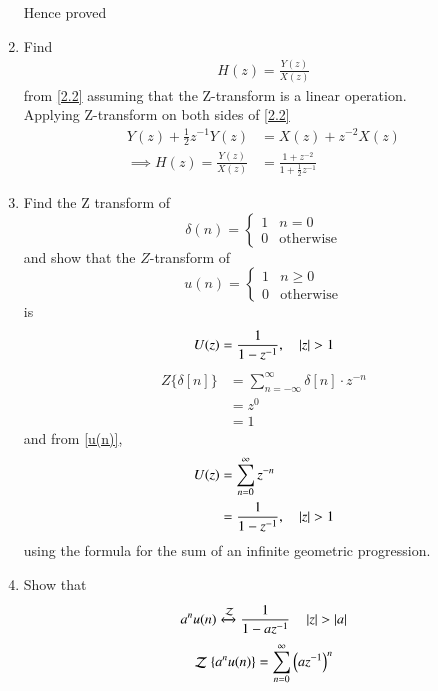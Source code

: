 \documentclass[journal,12pt,twocolumn]{IEEEtran}
\newcommand{\systemZ}[1]{\stackrel{#1}{\mathcal{Z}}}
\theoremstyle{remark}
\begin{document}
\begin{enumerate}[label=\thesection.\arabic*]
Hence proved \\
\item Find
\begin{align}
H(z)=\frac{Y(z)}{X(z)}
\end{align}
from \eqref{2.2} assuming that the Z-transform is a linear operation.\\
\solution Applying Z-transform on both sides of \eqref{2.2}
\begin{align}
Y(z)+\frac{1}{2}z^{-1}Y(z) &= X(z)+z^{-2}X(z) \\
\implies H(z)= \frac{Y(z)}{X(z)}&=\frac{1+z^{-2}}{1+\frac{1}{2}z^{-1}} \label{3.2}
\end{align}
\item Find the Z transform of 
\begin{equation}
\delta(n)
=
\begin{cases}
1 & n = 0
\\
0 & \text{otherwise}
\end{cases}
\end{equation}
and show that the $Z$-transform of
\begin{equation}
\label{u(n)}
u(n)
=
\begin{cases}
1 & n \ge 0
\\
0 & \text{otherwise}
\end{cases}
\end{equation}
is
\begin{equation}
U(z) = \frac{1}{1-z^{-1}}, \quad \left\vert z\right\vert > 1
\end{equation}
\solution
 \begin{align}
    Z\{ \delta[n] \} &= \sum_{n=-\infty}^{\infty} \delta[n] \cdot z^{-n} \\
                     &= z^0 \\
                     &= 1
\end{align}
and from \eqref{u(n)},
\begin{align}
U(z) &= \sum _{n= 0}^{\infty}z^{-n} \\
&=\frac{1}{1-z^{-1}}, \quad \left\vert z\right\vert > 1
\end{align}
using the formula for the sum of an infinite geometric progression.
\item Show that 
\begin{equation}
\label{eq:anun}
a^nu(n) \xleftrightarrow{\systemZ{}}\frac{1}{1-az^{-1}} \quad \abs{z} > \abs{a}
\end{equation}
\solution 
\begin{align}
	\systemZ{}\cbrak{a^nu(n)}&= \sum_{n = 0}^{\infty}\brak{az^{-1}}^n \\

\end{align}
\end{enumerate}
\end{document}
